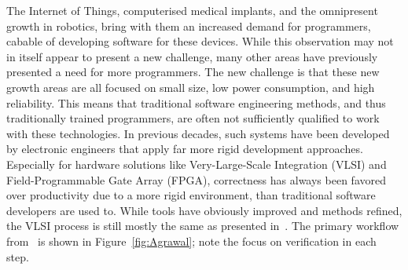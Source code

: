 The Internet of Things, computerised medical implants, and the omnipresent growth in robotics, bring with them an increased demand for programmers, cabable of developing software for these devices. While this observation may not in itself appear to present a new challenge, many other areas have previously presented a need for more programmers. The new challenge is that these new growth areas are all focused on small size, low power consumption, and high reliability. This means that traditional software engineering methods, and thus traditionally trained programmers, are often not sufficiently qualified to work with these technologies.
In previous decades, such systems have been developed by electronic engineers that apply far more rigid development approaches. Especially for hardware solutions like Very-Large-Scale Integration (VLSI) and Field-Programmable Gate Array (FPGA), correctness has always been favored over productivity due to a more rigid environment, than traditional software developers are used to.
While tools have obviously improved and methods refined, the VLSI process is still mostly the same as presented in~\cite{Agrawal:1985:VDP:320599.322570}. The primary workflow from~\cite{Agrawal:1985:VDP:320599.322570} is shown in Figure~\ref{fig:Agrawal}; note the focus on verification in each step.\\
